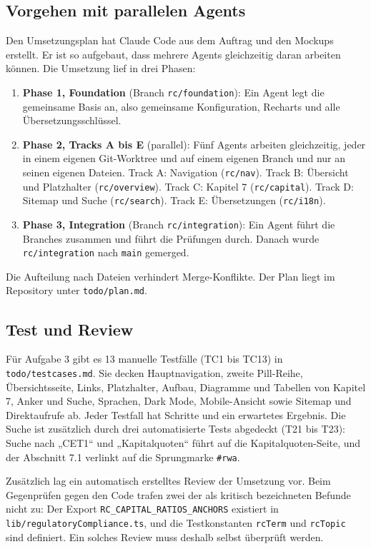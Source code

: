 \documentclass[11pt,a4paper]{article}
\let\oldsubsection\subsection
\renewcommand{\subsection}{\needspace{6\baselineskip}\oldsubsection}
\begin{document}
\subsection{Vorgehen mit parallelen Agents}
Den Umsetzungsplan hat Claude Code aus dem Auftrag und den Mockups erstellt. Er ist so aufgebaut, dass mehrere Agents gleichzeitig daran arbeiten können. Die Umsetzung lief in drei Phasen:
\begin{enumerate}[nosep]
  \item \textbf{Phase 1, Foundation} (Branch \texttt{rc/foundation}): Ein Agent legt die gemeinsame Basis an, also gemeinsame Konfiguration, Recharts und alle Übersetzungsschlüssel.
  \item \textbf{Phase 2, Tracks A bis E} (parallel): Fünf Agents arbeiten gleichzeitig, jeder in einem eigenen Git-Worktree und auf einem eigenen Branch und nur an seinen eigenen Dateien. Track A: Navigation (\texttt{rc/nav}). Track B: Übersicht und Platzhalter (\texttt{rc/overview}). Track C: Kapitel 7 (\texttt{rc/capital}). Track D: Sitemap und Suche (\texttt{rc/search}). Track E: Übersetzungen (\texttt{rc/i18n}).
  \item \textbf{Phase 3, Integration} (Branch \texttt{rc/integration}): Ein Agent führt die Branches zusammen und führt die Prüfungen durch. Danach wurde \texttt{rc/integration} nach \texttt{main} gemerged.
\end{enumerate}
Die Aufteilung nach Dateien verhindert Merge-Konflikte. Der Plan liegt im Repository unter \texttt{todo/plan.md}.

\subsection{Test und Review}
Für Aufgabe 3 gibt es 13 manuelle Testfälle (TC1 bis TC13) in \texttt{todo/testcases.md}. Sie decken Hauptnavigation, zweite Pill-Reihe, Übersichtsseite, Links, Platzhalter, Aufbau, Diagramme und Tabellen von Kapitel 7, Anker und Suche, Sprachen, Dark Mode, Mobile-Ansicht sowie Sitemap und Direktaufrufe ab. Jeder Testfall hat Schritte und ein erwartetes Ergebnis. Die Suche ist zusätzlich durch drei automatisierte Tests abgedeckt (T21 bis T23): Suche nach „CET1“ und „Kapitalquoten“ führt auf die Kapitalquoten-Seite, und der Abschnitt 7.1 verlinkt auf die Sprungmarke \texttt{\#rwa}.

Zusätzlich lag ein automatisch erstelltes Review der Umsetzung vor. Beim Gegenprüfen gegen den Code trafen zwei der als kritisch bezeichneten Befunde nicht zu: Der Export \texttt{RC\_\allowbreak CAPITAL\_\allowbreak RATIOS\_\allowbreak ANCHORS} existiert in \texttt{lib/\allowbreak regulatoryCompliance.ts}, und die Testkonstanten \texttt{rcTerm} und \texttt{rcTopic} sind definiert. Ein solches Review muss deshalb selbst überprüft werden.
\end{document}
